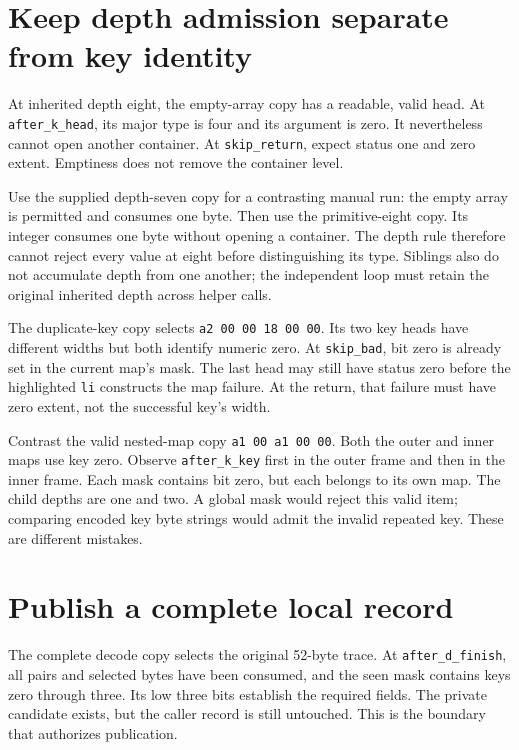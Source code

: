 \section{Keep depth admission separate from key identity}

At inherited depth eight, the empty-array copy has a readable, valid head.
At \texttt{after\_k\_head}, its major type is four and its argument is zero.
It nevertheless cannot open another container. At \texttt{skip\_return}, expect
status one and zero extent. Emptiness does not remove the container level.

Use the supplied depth-seven copy for a contrasting manual run: the empty array
is permitted and consumes one byte. Then use the primitive-eight copy. Its
integer consumes one byte without opening a container. The depth rule therefore
cannot reject every value at eight before distinguishing its type. Siblings
also do not accumulate depth from one another; the independent loop must retain
the original inherited depth across helper calls.

The duplicate-key copy selects \texttt{a2 00 00 18 00 00}. Its two key heads
have different widths but both identify numeric zero. At \texttt{skip\_bad},
bit zero is already set in the current map's mask. The last head may still have
status zero before the highlighted \texttt{li} constructs the map failure.
At the return, that failure must have zero extent, not the successful key's width.

Contrast the valid nested-map copy \texttt{a1 00 a1 00 00}. Both the outer and
inner maps use key zero. Observe \texttt{after\_k\_key} first in the outer
frame and then in the inner frame. Each mask contains bit zero, but each belongs
to its own map. The child depths are one and two. A global mask would reject
this valid item; comparing encoded key byte strings would admit the invalid
repeated key. These are different mistakes.

\section{Publish a complete local record}

The complete decode copy selects the original 52-byte trace. At
\texttt{after\_d\_finish}, all pairs and selected bytes have been consumed,
and the seen mask contains keys zero through three. Its low three bits establish
the required fields. The private candidate exists, but the caller record is
still untouched. This is the boundary that authorizes publication.

